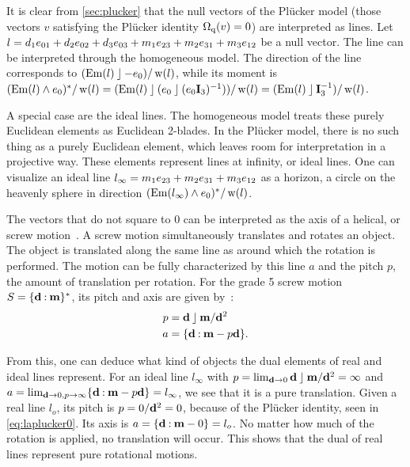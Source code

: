 It is clear from \autoref{sec:plucker} that the null vectors of the Pl\"ucker model (those vectors $v$ satisfying the Pl\"ucker identity $\operatorname{\Omega_q}(v) = 0$) are interpreted as lines.  Let $l = d_1 e_{01} + d_2 e_{02} + d_3 e_{03} + m_1 e_{23} + m_2 e_{31} + m_3 e_{12}$ be a null vector.  The line can be interpreted through the homogeneous model.  The direction of the line corresponds to $(\operatorname{Em}(l) \mathbin{\rfloor} -e_0) / \operatorname{w}(l)$, while its moment is $(\operatorname{Em}(l) \wedge e_0)^\ast / \operatorname{w}(l) = (\operatorname{Em}(l) \mathbin{\rfloor} (e_0 \mathbin{\rfloor} (e_0\mathbf{I}_3)^{-1})) / \operatorname{w}(l) = (\operatorname{Em}(l) \mathbin{\rfloor} \mathbf{I}_3^{-1}) / \operatorname{w}(l)$.  

A special case are the ideal lines.  The homogeneous model treats these purely Euclidean elements as Euclidean 2-blades.
In the Pl\"ucker model, there is no such thing as a purely Euclidean element, which leaves room for interpretation in a projective way.  These elements represent lines at infinity, or ideal lines.  One can visualize an ideal line $l_\infty = m_1 e_{23} + m_2 e_{31} + m_3 e_{12}$ as a horizon, a circle on the heavenly sphere in direction $(\operatorname{Em}(l_\infty) \wedge e_0)^\ast / \operatorname{w}(l)$.  

The vectors that do not square to $0$ can be interpreted as the axis of a helical, or screw motion~\cite[Section 3.1.2]{Pottmann}.  A screw motion simultaneously translates and rotates an object.  The object is translated along the same line as around which the rotation is performed.  The motion can be fully characterized by this line $a$ and the pitch $p$, the amount of translation per rotation.  For the grade 5 screw motion $S = \{\mathbf{d} \mathbin{:} \mathbf{m}\}^\ast$, its pitch and axis are given by~\cite[Theorem 3.1.9]{Pottmann}:
\begin{align}
  \label{eq:screwparams}
  p &= \mathbf{d} \mathbin{\rfloor} \mathbf{m} / \mathbf{d}^2 \nonumber \\
  a &= \{\mathbf{d} \mathbin{:} \mathbf{m} - p \mathbf{d}\} .
\end{align}

From this, one can deduce what kind of objects the dual elements of real and ideal lines represent.  For an ideal line $l_\infty$ with $p = \lim_{\mathbf{d} \to 0} \mathbf{d} \mathbin{\rfloor} \mathbf{m} / \mathbf{d}^2 = \infty$ and $a = \lim_{\mathbf{d} \to 0, p \to \infty} \{\mathbf{d} \mathbin{:} \mathbf{m} - p \mathbf{d}\} = l_\infty$, we see that it is a pure translation.  Given a real line $l_o$, its pitch is $p = 0 / \mathbf{d}^2 = 0$, because of the Pl\"ucker identity, seen in \autoref{eq:laplucker0}.  Its axis is $a = \{\mathbf{d} \mathbin{:} \mathbf{m} - 0\} = l_o$.  No matter how much of the rotation is applied, no translation will occur.  This shows that the dual of real lines represent pure rotational motions.

